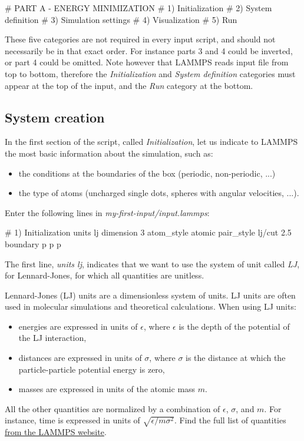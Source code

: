 \begin{lcverbatim}
# PART A - ENERGY MINIMIZATION
# 1) Initialization
# 2) System definition
# 3) Simulation settings
# 4) Visualization
# 5) Run
\end{lcverbatim}

\noindent These five categories are not required in every
input script, and should not necessarily be in that
exact order. For instance parts 3 and 4 could be inverted, or
part 4 could be omitted. Note however that LAMMPS reads input
file from top to bottom, therefore the \textit{Initialization} and 
\textit{System definition} categories must appear at the top of the
input, and the \textit{Run} category at the bottom.

\subsection{System creation}

\noindent In the first section of the script, called \textit{Initialization},
let us indicate to LAMMPS the most basic information
about the simulation, such as:
\begin{itemize}
\item the conditions at the boundaries of the box (periodic, non-periodic, ...)
\item the type of atoms (uncharged single dots, spheres with angular velocities, ...).
\end{itemize}
Enter the following lines in \textit{my-first-input/input.lammps}:

\begin{lcverbatim}
# 1) Initialization
units lj
dimension 3
atom_style atomic
pair_style lj/cut 2.5
boundary p p p
\end{lcverbatim}

\noindent The first line, \textit{units lj}, indicates that we want to
use the system of unit called \textit{LJ}, for Lennard-Jones, for
which all quantities are unitless. 

\begin{tcolorbox}[colback=mylightblue!5!white,colframe=mylightblue!75!black,title=About Lennard-Jones (LJ) units]
Lennard-Jones (LJ) units are a dimensionless system of units.
LJ units are often used in molecular simulations
and theoretical calculations. When using LJ units:
\begin{itemize}
\item energies are expressed in units of $\epsilon$, where $\epsilon$ is the
  depth of the potential of the LJ interaction,
\item distances are expressed in units of $\sigma$, where $\sigma$ is the distance
  at which the particle-particle potential energy is zero,
\item masses are expressed in units of the atomic mass $m$.
\end{itemize}
All the other quantities are normalized by a combination of $\epsilon$, $\sigma$,
and $m$. For instance, time is expressed in units of $\sqrt{ \epsilon / m \sigma^2}$.
Find the full list of quantities \href{https://docs.lammps.org/units.html}{from the LAMMPS website}.

\end{tcolorbox}

